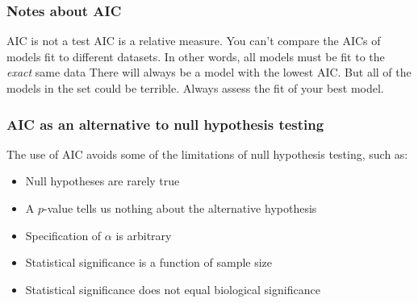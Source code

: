 \documentclass[color=usenames,dvipsnames]{beamer}\usepackage[]{graphicx}\usepackage[]{color}
\begin{document}
\begin{frame}
  \frametitle{Notes about AIC}
    AIC is not a test
    \pause
    \vfill
    AIC is a relative measure. You can't compare the AICs of
      models fit to different datasets.
    \pause
    \vfill
    In other words, all models must be fit to the {\it
        exact} same data
    \pause
    \vfill
    There will always be a model with the lowest AIC. But all of
      the models in the set could be terrible.
    \pause
    \vfill
    Always assess the fit of your best model.
\end{frame}





\begin{frame}
  \frametitle{\normalsize AIC as an alternative to null hypothesis testing} %
  The use of AIC avoids some of the limitations of null hypothesis
  testing, such as: \\
  \begin{itemize}
    \item Null hypotheses are rarely true %
    \item A $p$-value tells us nothing about the alternative hypothesis %
    \item Specification of $\alpha$ is arbitrary %
    \item Statistical significance is a function of sample size %
    \item Statistical significance does not equal biological significance
  \end{itemize}
\end{frame}
\end{document}
